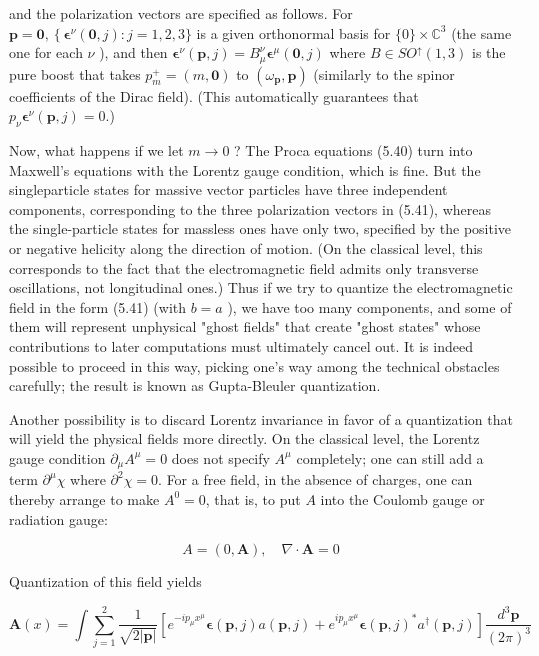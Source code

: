 \documentclass[10pt, letterpaper]{article}
\begin{document}
and the polarization vectors are specified as follows. For $\mathbf{p}=\mathbf{0},\left\{\boldsymbol{\epsilon}^{\nu}(\mathbf{0}, j): j=\right. 1,2,3\}$ is a given orthonormal basis for $\{0\} \times \mathbb{C}^{3}$ (the same one for each $\nu$ ), and then $\boldsymbol{\epsilon}^{\nu}(\mathbf{p}, j)=B_{\mu}^{\nu} \boldsymbol{\epsilon}^{\mu}(\mathbf{0}, j)$ where $B \in S O^{\uparrow}(1,3)$ is the pure boost that takes $p_{m}^{+}=(m, \mathbf{0})$ to $\left(\omega_{\mathbf{p}}, \mathbf{p}\right)$ (similarly to the spinor coefficients of the Dirac field). (This automatically guarantees that $p_{\nu} \boldsymbol{\epsilon}^{\nu}(\mathbf{p}, j)=0$.)

Now, what happens if we let $m \rightarrow 0$ ? The Proca equations (5.40) turn into Maxwell's equations with the Lorentz gauge condition, which is fine. But the singleparticle states for massive vector particles have three independent components, corresponding to the three polarization vectors in (5.41), whereas the single-particle states for massless ones have only two, specified by the positive or negative helicity along the direction of motion. (On the classical level, this corresponds to the fact that the electromagnetic field admits only transverse oscillations, not longitudinal ones.) Thus if we try to quantize the electromagnetic field in the form (5.41) (with $b=a$ ), we have too many components, and some of them will represent unphysical "ghost fields" that create "ghost states" whose contributions to later computations must ultimately cancel out. It is indeed possible to proceed in this way, picking one's way among the technical obstacles carefully; the result is known as Gupta-Bleuler quantization.

Another possibility is to discard Lorentz invariance in favor of a quantization that will yield the physical fields more directly. On the classical level, the Lorentz gauge condition $\partial_{\mu} A^{\mu}=0$ does not specify $A^{\mu}$ completely; one can still add a term $\partial^{\mu} \chi$ where $\partial^{2} \chi=0$. For a free field, in the absence of charges, one can thereby arrange to make $A^{0}=0$, that is, to put $A$ into the Coulomb gauge or radiation gauge:

$$
A=(0, \mathbf{A}), \quad \nabla \cdot \mathbf{A}=0
$$

Quantization of this field yields

$$
\mathbf{A}(x)=\int \sum_{j=1}^{2} \frac{1}{\sqrt{2|\mathbf{p}|}}\left[e^{-i p_{\mu} x^{\mu}} \boldsymbol{\epsilon}(\mathbf{p}, j) a(\mathbf{p}, j)+e^{i p_{\mu} x^{\mu}} \boldsymbol{\epsilon}(\mathbf{p}, j)^{*} a^{\dagger}(\mathbf{p}, j)\right] \frac{d^{3} \mathbf{p}}{(2 \pi)^{3}}
$$
\end{document}
